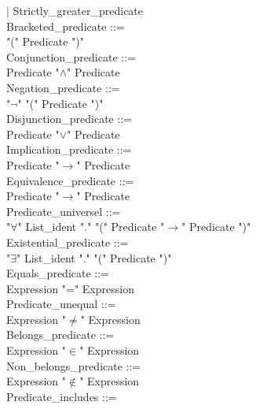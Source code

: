 \documentclass[12pt,a4paper,draft]{article}
\begin{document}
{\begin{sloppypar}
\hspace*{0.20in} $|$  Strictly\_greater\_predicate\\
Bracketed\_predicate ::= \\
\hspace*{0.20in}"("  Predicate  ")" \\
Conjunction\_predicate ::= \\
\hspace*{0.20in} Predicate  "$\land$"  Predicate\\
Negation\_predicate ::= \\
\hspace*{0.20in}"$\neg$" "(" Predicate ")" \\
Disjunction\_predicate ::= \\
\hspace*{0.20in} Predicate  "$\lor$"  Predicate\\
Implication\_predicate ::= \\
\hspace*{0.20in} Predicate  "$\rightarrow$"  Predicate\\
Equivalence\_predicate ::= \\
\hspace*{0.20in} Predicate  "$\rightarrow$"  Predicate\\
Predicate\_universel ::= \\
\hspace*{0.20in}"$\forall$" List\_ident "." "(" Predicate  "$\rightarrow$"  Predicate ")" \\
Existential\_predicate ::= \\
\hspace*{0.20in}"$\exists$" List\_ident "." "(" Predicate ")" \\
Equals\_predicate ::= \\
\hspace*{0.20in} Expression  "="  Expression\\
Predicate\_unequal ::= \\
\hspace*{0.20in} Expression  "$\neq$"  Expression \\
Belongs\_predicate ::= \\
\hspace*{0.20in} Expression  "$\in$"  Expression\\
Non\_belongs\_predicate ::= \\
\hspace*{0.20in} Expression  "$\notin$"  Expression\\
Predicate\_includes ::= \\

\end{sloppypar}}
\end{document}

